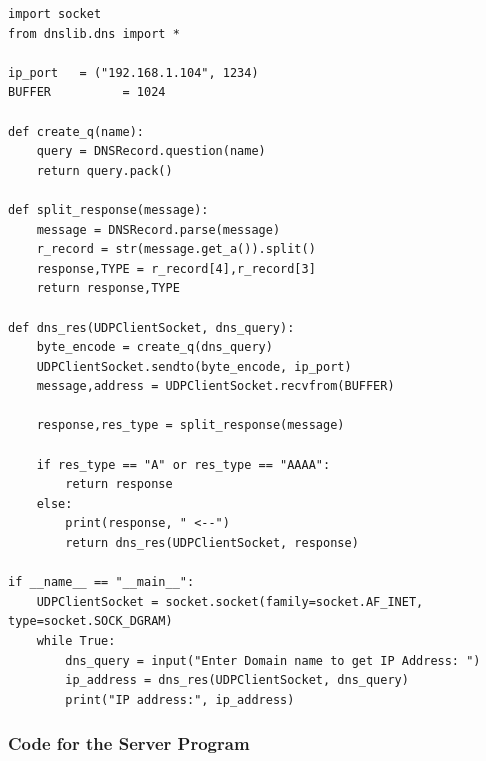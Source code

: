 \documentclass[11pt]{article}
\begin{document}
\begin{verbatim}
import socket
from dnslib.dns import *

ip_port   = ("192.168.1.104", 1234)
BUFFER          = 1024

def create_q(name):
    query = DNSRecord.question(name)
    return query.pack()

def split_response(message):
    message = DNSRecord.parse(message)
    r_record = str(message.get_a()).split()
    response,TYPE = r_record[4],r_record[3]
    return response,TYPE

def dns_res(UDPClientSocket, dns_query):
    byte_encode = create_q(dns_query)
    UDPClientSocket.sendto(byte_encode, ip_port)
    message,address = UDPClientSocket.recvfrom(BUFFER)

    response,res_type = split_response(message)

    if res_type == "A" or res_type == "AAAA":
        return response
    else:
        print(response, " <--")
        return dns_res(UDPClientSocket, response)

if __name__ == "__main__":
    UDPClientSocket = socket.socket(family=socket.AF_INET, type=socket.SOCK_DGRAM)
    while True:
        dns_query = input("Enter Domain name to get IP Address: ")
        ip_address = dns_res(UDPClientSocket, dns_query)
        print("IP address:", ip_address)
\end{verbatim}

\subsubsection{Code for the Server Program}
\end{document}
